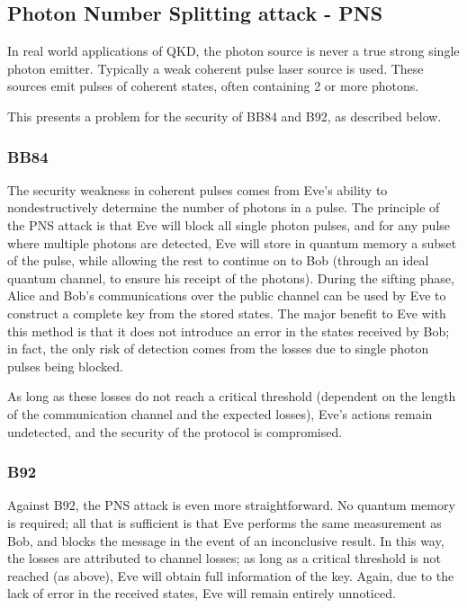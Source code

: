 \documentclass[paper=a4, fontsize=11pt]{scrartcl} %
\numberwithin{equation}{section} %
\numberwithin{figure}{section} %
\numberwithin{table}{section} %
\begin{document}
\subsection{Photon Number Splitting attack - PNS} %
In real world applications of QKD, the photon source is never a true strong single photon emitter. Typically
a weak coherent pulse laser source is used. %
These sources emit pulses of coherent states, often containing 2 or more photons.

This presents a problem for the security of BB84 and B92, as described below.

\subsubsection{BB84}

The security weakness in coherent pulses comes from Eve's ability to nondestructively determine the number of photons
in a pulse. The principle of the PNS attack is that Eve will block all single photon pulses, and for any pulse where
multiple photons are detected, Eve will store in quantum memory a subset of the pulse, while allowing the rest to continue
on to Bob (through an ideal quantum channel, to ensure his receipt of the photons). During the sifting
phase, Alice and Bob's communications over the public channel can be used by Eve to construct
a complete key from the stored states. The major benefit to Eve with this method is that it does not introduce an error in the
states received by Bob; in fact, the only risk of detection comes from the losses due to single photon pulses being blocked.

As long as these losses do not reach a critical threshold (dependent on the length of the communication channel and the expected losses),
Eve's actions remain undetected, and the security of the protocol is compromised.


\subsubsection{B92}

Against B92, the PNS attack is even more straightforward. No quantum memory is required; all that is sufficient is that Eve performs
the same measurement as Bob, and blocks the message in the event of an inconclusive result. In this way, the losses are attributed
to channel losses; as long as a critical threshold is not reached (as above), Eve will obtain full information of the key. Again, due to
the lack of error in the received states, Eve will remain entirely unnoticed. \citep{proofBB84}






\end{document}
